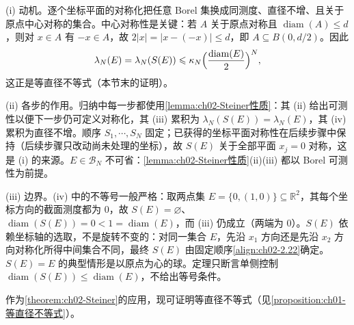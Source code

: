 \documentclass[../../main.tex]{subfiles}%
\begin{document}
\begin{remark}\label{remark:ch02-Steiner动机}
(i) 动机。逐个坐标平面的对称化把任意 Borel 集换成同测度、直径不增、且关于原点中心对称的集合。中心对称性是关键：若 $A$ 关于原点对称且 $\operatorname{diam}(A)\leqslant d$，则对 $x\in A$ 有 $-x\in A$，故 $2|x|=|x-(-x)|\leqslant d$，即 $A\subseteq B(0,d/2)$。因此
\begin{align*}
\lambda_N(E)=\lambda_N(S(E))\leqslant\kappa_N\Bigl(\frac{\operatorname{diam}(E)}2\Bigr)^N,
\end{align*}
这正是等直径不等式（本节末的证明）。

(ii) 各步的作用。归纳中每一步都使用\cref{lemma:ch02-Steiner性质}：其 (ii) 给出可测性以便下一步仍可定义对称化，其 (iii) 累积为 $\lambda_N(S(E))=\lambda_N(E)$，其 (iv) 累积为直径不增。顺序 $S_1,\cdots ,S_N$ 固定；已获得的坐标平面对称性在后续步骤中保持（后续步骤只改动尚未处理的坐标），故 $S(E)$ 关于全部平面 $x_j=0$ 对称，这是 (i) 的来源。$E\in\mathscr B_N$ 不可省：\cref{lemma:ch02-Steiner性质}(ii)(iii) 都以 Borel 可测性为前提。

(iii) 边界。(iv) 中的不等号一般严格：取两点集 $E=\{0,(1,0)\}\subseteq\mathbb R^2$，其每个坐标方向的截面测度都为 $0$，故 $S(E)=\varnothing$、$\operatorname{diam}(S(E))=0<1=\operatorname{diam}(E)$，而 (iii) 仍成立（两端为 $0$）。$S(E)$ 依赖坐标轴的选取，不是旋转不变的：对同一集合 $E$，先沿 $x_1$ 方向还是先沿 $x_2$ 方向对称化所得中间集合不同，最终 $S(E)$ 由固定顺序\eqref{align:ch02-2.22}确定。$S(E)=E$ 的典型情形是以原点为心的球。定理只断言单侧控制 $\operatorname{diam}(S(E))\leqslant\operatorname{diam}(E)$，不给出等号条件。
\end{remark}

作为\cref{theorem:ch02-Steiner}的应用，现可证明等直径不等式（见\cref{proposition:ch01-等直径不等式}）。
\end{document}
